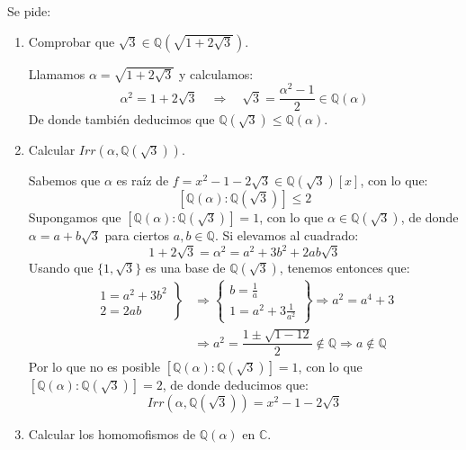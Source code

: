 \begin{ejercicio} %
    Se pide:
    \begin{enumerate}
        \item Comprobar que $\sqrt{3}\in \mathbb{Q}\left(\sqrt{1+2\sqrt{3}}\right)$.

            Llamamos $\alpha = \sqrt{1+2\sqrt{3}}$ y calculamos:
            \begin{equation*}
                \alpha^2 = 1+2\sqrt{3} \quad \Longrightarrow \quad  \sqrt{3} = \dfrac{\alpha^{2}-1}{2}\in \mathbb{Q}(\alpha)
            \end{equation*}
            De donde también deducimos que $\mathbb{Q}(\sqrt{3})\leq \mathbb{Q}(\alpha)$.
        \item Calcular $Irr\left(\alpha, \mathbb{Q}\left(\sqrt{3}\right)\right)$.

            Sabemos que $\alpha$ es raíz de $f=x^2-1-2\sqrt{3}\in \mathbb{Q}\left(\sqrt{3}\right)[x]$, con lo que:
            \begin{equation*}
                \left[\mathbb{Q}(\alpha):\mathbb{Q}\left(\sqrt{3}\right)\right] \leq 2
            \end{equation*}
            Supongamos que $\left[\mathbb{Q}(\alpha):\mathbb{Q}\left(\sqrt{3}\right)\right]=1$, con lo que $\alpha\in \mathbb{Q}\left(\sqrt{3}\right)$, de donde $\alpha = a + b\sqrt{3}$ para ciertos $a,b\in \mathbb{Q}$. Si elevamos al cuadrado:
            \begin{equation*}
                1 + 2\sqrt{3} = \alpha^2 = a^2 + 3b^2 + 2ab\sqrt{3}
            \end{equation*}
            Usando que $\{1,\sqrt{3}\}$ es una base de $\mathbb{Q}\left(\sqrt{3}\right)$, tenemos entonces que:
            \begin{align*}
                \left.\begin{array}{l}
                    1 = a^2 + 3b^2 \\
                    2 = 2 ab
                    \end{array}\right\} &\Longrightarrow \left\{\begin{array}{l}
                    b = \frac{1}{a} \\
                    1 = a^2 + 3\frac{1}{a^2}
            \end{array}\right\} \Longrightarrow a^2 = a^4 + 3 \\ &\Longrightarrow a^2 = \dfrac{1\pm \sqrt{1-12}}{2} \notin \mathbb{Q} \Longrightarrow a \notin \mathbb{Q}
            \end{align*}
            Por lo que no es posible $\left[\mathbb{Q}(\alpha):\mathbb{Q}\left(\sqrt{3}\right)\right]=1$, con lo que $\left[\mathbb{Q}(\alpha):\mathbb{Q}\left(\sqrt{3}\right)\right]=2$, de donde deducimos que:
            \begin{equation*}
                Irr\left(\alpha,\mathbb{Q}\left(\sqrt{3}\right)\right) = x^2-1-2\sqrt{3}
            \end{equation*}
        \item Calcular los homomofismos de $\mathbb{Q}(\alpha)$ en $\mathbb{C}$.


\end{enumerate}
\end{ejercicio}
